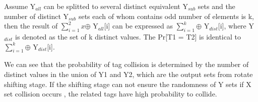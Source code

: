 \documentclass{article}
\begin{document}
Assume Y$_{all}$ can be splitted to several distinct equivalent Y$_{sub}$ sets
and the number of distinct Y$_{sub}$ sets each of whom contains odd number of elements is k, then the
result of $\sum_{i=1}^2x$$\oplus$ Y$_{all}$[i] can be expressed as
$\sum_{i=1}^k$$\oplus$ Y$_{dist}$[i], where Y$_{dist}$ is denoted as the set of
k distinct values. The Pr[T1 = T2] is identical to $\sum_{i=1}^k$$\oplus$
Y$_{dist}$[i]. 

We can see that the probability of tag collision is determined by the number of
distinct values in the union of Y1 and Y2, which are the output sets from rotate
shifting stage. If the shifting stage can not ensure the randomness of Y sets
if X set collision occurs , the related tags have high probability to collide.
\begin{figure}
\centering
{}
\end{figure}
\end{document}
